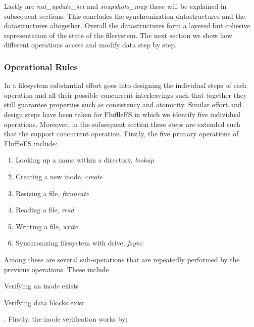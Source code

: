Lastly are \textit{nat\_update\_set} and \textit{snapshots\_map} these will be
explained in subsequent sections. This concludes the synchronization
datastructures and the datastructures altogether. Overall the datastructures
form a layered but cohesive representation of the state of the filesystem. The
next section we show how different operations access and modify data step by
step.

\subsubsection{Operational Rules}

In a filesystem substantial effort goes into designing the individual steps of
each operation and all their possible concurrent interleavings such that
together they still guarantee properties such as consistency and atomicity.
Similar effort and design steps have been taken for FluffleFS in which we
identify five individual operations. Moreover, in the subsequent section these
steps are extended such that the support concurrent operation. Firstly, the
five primary operations of FluffleFS include:

\begin{enumerate}
    \item Looking up a name within a directory, \textit{lookup}
    \item Creating a new inode, \textit{create}
    \item Resizing a file, \textit{ftruncate}
    \item Reading a file, \textit{read}
    \item Writting a file, \textit{write}
    \item Synchronizing filesystem with drive, \textit{fsync}
\end{enumerate}

Among these are several sub-operations that are repeatedly performed by the
previous operations. These include \begin{enumerate*} \item Verifying an inode
exists \item Verifying data blocks exist \end{enumerate*}. Firstly, the
inode verification works by:

